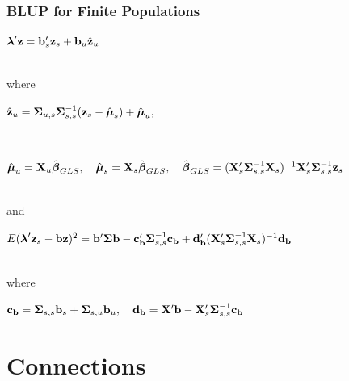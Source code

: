 \documentclass[mathserif,compress]{beamer}\usepackage{graphicx, color}
\def\bb{\mathbf{b}}
\def\bc{\mathbf{c}}
\def\bd{\mathbf{d}}
\def\bz{\mathbf{z}}
\def\bX{\mathbf{X}}
\def\bbeta{\mbox{\boldmath $\beta$}}
\def\blambda{\mbox{\boldmath $\lambda$}}
\def\bmu{\mbox{\boldmath $\mu$}}
\def\bSigma{\mbox{\boldmath $\Sigma$}}
\def\upp{^\prime}
\def\upi{^{-1}}
\begin{document}

\begin{frame}[fragile]
\frametitle{BLUP for Finite Populations}

	\begin{center}
		 $\blambda\upp\bz = \bb_s\upp\bz_s + \bb_u\hat{\bz}_u$
	\end{center} \\
	where \\
	\begin{center}
		$\hat{\bz}_u = \bSigma_{u,s}\bSigma\upi_{s,s}(\bz_s - \hat{\bmu}_s) + \hat{\bmu}_u,$
	\end{center} \\
	\begin{center}
		$\hat{\bmu}_u = \bX_u\hat{\bbeta}_{GLS}, \quad \hat{\bmu}_s = \bX_s\hat{\bbeta}_{GLS}, \quad 
\hat{\bbeta}_{GLS} = (\bX_s\upp\bSigma_{s,s}\upi\bX_s)\upi\bX_s\upp\bSigma_{s,s}\upi\bz_s$
	\end{center} \\
	and
	\begin{center}
		 $E(\blambda\upp\bz_s - \bb\bz)^2 = \bb\upp\bSigma\bb - \bc_\bb\upp\bSigma_{s,s}\upi\bc_\bb + \bd_\bb\upp(\bX_s\upp\bSigma_{s,s}\upi\bX_s)\upi\bd_\bb$
	\end{center} \\
	where \\
	\begin{center}
		$\bc_\bb = \bSigma_{s,s}\bb_s + \bSigma_{s,u}\bb_u, \quad \bd_\bb = \bX\upp\bb - \bX_s\upp\bSigma_{s,s}\upi\bc_\bb$
	\end{center} 


\end{frame}


\section{Connections}
\end{document}

